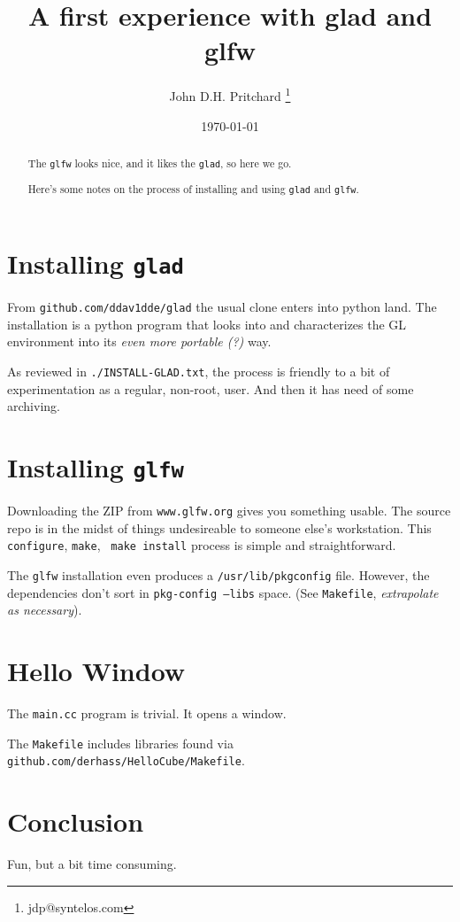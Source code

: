 \documentclass[12pt,twocolumn]{article}
\begin{document}
\title{A first experience with glad and glfw}

\author{John D.H. Pritchard \thanks{jdp@syntelos.com}}

\date{\today}

\maketitle


\begin{abstract}

The {\tt glfw} looks nice, and it likes the {\tt glad}, so here we go.

Here's some notes on the process of installing and using {\tt glad}
and {\tt glfw}.

\end{abstract}


\section{Installing {\tt glad}}

From {\tt github.com/ddav1dde/glad} the usual clone enters into python
land.  The installation is a python program that looks into and
characterizes the GL environment into its {\it even more portable (?)
}  way.  

As reviewed in {\tt ./INSTALL-GLAD.txt}, the process is friendly to a
bit of experimentation as a regular, non-root, user.  And then it has
need of some archiving.

\section{Installing {\tt glfw}}

Downloading the ZIP from {\tt www.glfw.org} gives you something
usable.  The source repo is in the midst of things undesireable to
someone else's workstation.  This {\tt configure}, {\tt make}, {\tt
  make install} process is simple and straightforward.  

The {\tt glfw} installation even produces a {\tt /usr/lib/pkgconfig}
file.  However, the dependencies don't sort in {\tt pkg-config --libs}
space.  (See {\tt Makefile}, {\it extrapolate as necessary}).

\section{Hello Window}

The {\tt main.cc} program is trivial.  It opens a window.

The {\tt Makefile} includes libraries found via {\tt
  github.com/derhass/HelloCube/Makefile}.


\section{Conclusion}

Fun, but a bit time consuming.
\end{document}
